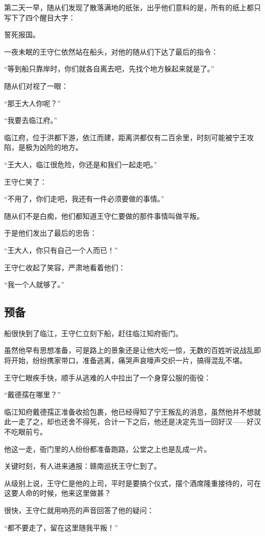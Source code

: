 \begin{multicols}{\theparacolNo}
		第二天一早，随从们发现了散落满地的纸张，出乎他们意料的是，所有的纸上都只写下了四个醒目大字：

		誓死报国。

		一夜未眠的王守仁依然站在船头，对他的随从们下达了最后的指令：

		“等到船只靠岸时，你们就各自离去吧，先找个地方躲起来就是了。”

		随从们对视了一眼：

		“那王大人你呢？”

		“我要去临江府。”

		临江府，位于洪都下游，依江而建，距离洪都仅有二百余里，时刻可能被宁王攻陷，是极为凶险的地方。

		“王大人，临江很危险，你还是和我们一起走吧。”

		王守仁笑了：

		“不用了，你们走吧，我还有一件必须要做的事情。”

		随从们不是白痴，他们都知道王守仁要做的那件事情叫做平叛。

		于是他们发出了最后的忠告：

		“王大人，你只有自己一个人而已！”

		王守仁收起了笑容，严肃地看着他们：

		“我一个人就够了。”

		\subsection{预备}
		船很快到了临江，王守仁立刻下船，赶往临江知府衙门。

		虽然他早有思想准备，可是路上的景象还是让他大吃一惊，无数的百姓听说战乱即将开始，纷纷携家带口，准备逃离，痛哭声哀嚎声交织一片，搞得混乱不堪。

		王守仁眼疾手快，顺手从逃难的人中拉出了一个身穿公服的衙役：

		“戴德孺在哪里？”

		临江知府戴德孺正准备收拾包裹，他已经得知了宁王叛乱的消息，虽然他并不想就此一走了之，却也还舍不得死，合计一下之后，他还是决定先当一回好汉——好汉不吃眼前亏。

		他这一走，衙门里的人纷纷都准备跑路，公堂之上也是乱成一片。

		关键时刻，有人进来通报：赣南巡抚王守仁到了。

		从级别上说，王守仁是他的上司，平时是要搞个仪式，摆个酒席隆重接待的，可在这要人命的时候，他来这里做甚？

		很快，王守仁就用响亮的声音回答了他的疑问：

		“都不要走了，留在这里随我平叛！”


\end{multicols}
